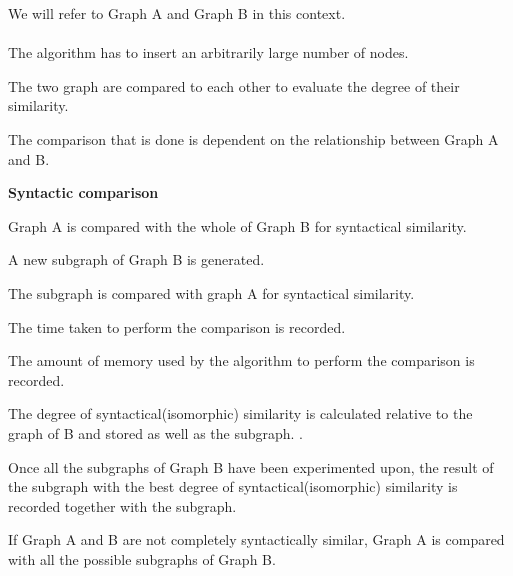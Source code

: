 We will refer to Graph A and Graph B in this context.\\\\
The algorithm has to insert an arbitrarily large number of nodes.
\begin{myEnumerate}
  \item The two graph are compared to each other to evaluate the degree of their similarity.
  \item The comparison that is done is dependent on the relationship between Graph A and B.
		\begin{myEnumerate}
			\item \textbf{Syntactic comparison}					
				\begin{myEnumerate}
					\item Graph A is compared with the whole of Graph B for syntactical similarity.										
						\begin{myEnumerate}
							\item A new subgraph of Graph B is generated.
							\item The subgraph is compared with graph A for syntactical similarity.											
								\begin{myEnumerate}
									\item The time taken to perform the comparison is recorded.
									\item The amount of memory used by the algorithm to perform the comparison is recorded.
									\item The degree of syntactical(isomorphic) similarity is calculated relative to the graph of B and stored as well as the subgraph.						.
								\end{myEnumerate}	
							\item Once all the subgraphs of Graph B have been experimented upon, the result of the subgraph with the best degree of syntactical(isomorphic) similarity
									is recorded together with the subgraph.					
						\end{myEnumerate}
						
					\item If Graph A and B are not completely syntactically similar, Graph A is compared with all the possible subgraphs of Graph B.
				\end{myEnumerate}
				

\end{myEnumerate}
\end{myEnumerate}
